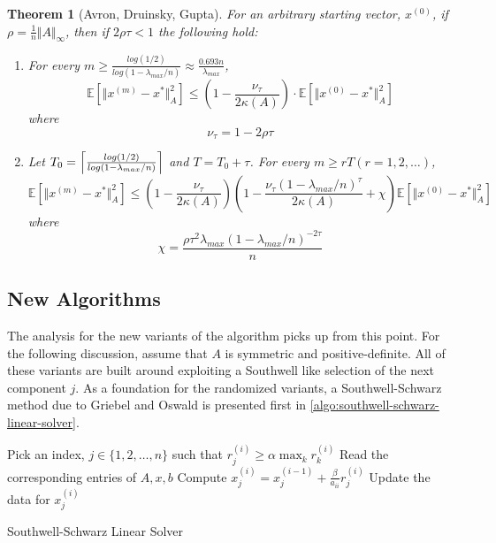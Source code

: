 \documentclass{article}
\newtheorem{theorem}{Theorem}
\theoremstyle{definition}
\theoremstyle{example}
\theoremstyle{example}
\theoremstyle{example}
\DeclarePairedDelimiter\ceil{\lceil}{\rceil}
\begin{document}
\begin{theorem}[Avron, Druinsky, Gupta]
	For an arbitrary starting vector, $x^{(0)}$, if $\rho = \frac{1}{n} \Vert A \Vert_\infty$, then if $2\rho \tau < 1$ the following hold:
		\begin{enumerate}
			\item For every $m \geq \frac{log(1/2)}{log(1-\lambda_{max}/n)} \approx \frac{0.693n}{\lambda_{max}}$,
					\begin{equation}
						\mathbb{E}[\Vert x^{(m)} - x^* \Vert_A^2] \leq \left( 1 - \frac{\nu_\tau}{2\kappa(A)}\right) \cdot \mathbb{E}[\Vert x^{(0)} - x^* \Vert_A^2]
					\end{equation}
				where
					\begin{equation}
						\nu_\tau = 1 - 2 \rho \tau
					\end{equation}
			\item Let $T_0 = \ceil*{\frac{log(1/2)}{log(1 - \lambda_{max}/n)}}$ and $T = T_0 + \tau$. For every $m \geq rT (r = 1, 2, \ldots)$,
					\begin{equation}
						\mathbb{E}[\Vert x^{(m)} - x^* \Vert_A^2] \leq \left( 1 - \frac{\nu_\tau}{2\kappa(A)}\right) \left( 1 - \frac{\nu_\tau(1 - \lambda_{max}/n)^\tau}{2\kappa(A)} + \chi \right) \mathbb{E}[\Vert x^{(0)} - x^* \Vert_A^2]
					\end{equation}
				where 
					\begin{equation}
						\chi = \frac{\rho \tau^2 \lambda_{max}(1 - \lambda_{max}/n)^{-2\tau}}{n}
					\end{equation}			
			\end{enumerate}
\end{theorem}

\subsection{New Algorithms}
\label{sect:new-algorithms}

The analysis for the new variants of the algorithm picks up from this point. For the following discussion, assume that $A$ is symmetric and positive-definite. All of these variants are built around exploiting a Southwell like selection of the next component $j$. As a foundation for the randomized variants, a Southwell-Schwarz method due to Griebel and Oswald is presented first in \cref{algo:southwell-schwarz-linear-solver}.

\begin{algorithm}[ht!]
	\DontPrintSemicolon
	 {
		 {
			Pick an index, $j \in \{1, 2, \ldots, n\}$ such that $r_j^{(i)} \geq \alpha \max_k r_k^{(i)}$ \; \label{alg:picksouthwell}
			Read the corresponding entries of $A, x, b$ \label{step:read25}\;
			Compute $x^{(i)}_j = x^{(i-1)}_j + \frac{\beta}{a_{ii}} r^{(i)}_j$ \;
			Update the data for $x^{(i)}_j$ \;
		}
	}
	\caption{Southwell-Schwarz Linear Solver}
	\label{algo:southwell-schwarz-linear-solver}
\end{algorithm}
\end{document}
